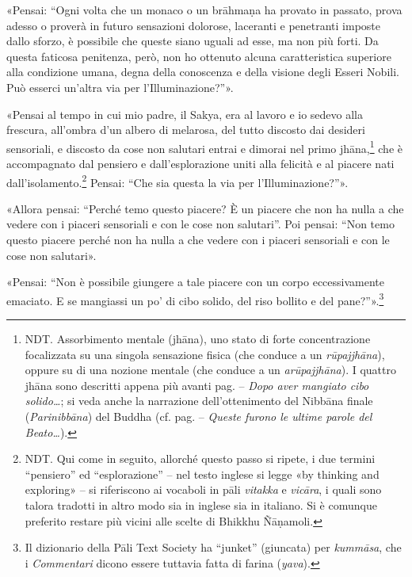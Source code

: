 
«Pensai: “Ogni volta che un monaco o un brāhmaṇa ha provato in passato, prova
adesso o proverà in futuro sensazioni dolorose, laceranti e penetranti imposte
dallo sforzo, è possibile che queste siano uguali ad esse, ma non più forti. Da
questa faticosa penitenza, però, non ho ottenuto alcuna caratteristica superiore
alla condizione umana, degna della conoscenza e della visione degli Esseri
Nobili. Può esserci un’altra via per l’Illuminazione?”».

«Pensai al tempo in cui mio padre, il Sakya, era al lavoro e io sedevo alla
frescura, all’ombra d’un albero di melarosa, del tutto discosto dai desideri
sensoriali, e discosto da cose non salutari entrai e dimorai nel primo
jhāna,\footnote{NDT. Assorbimento mentale (jhāna), uno stato di forte
  concentrazione focalizzata su una singola sensazione fisica (che conduce a un
  \emph{rūpajjhāna}), oppure su di una nozione mentale (che conduce a un
  \emph{arūpajjhāna}). I quattro jhāna sono descritti appena più avanti pag.
  \pageref{pag27} -- \emph{Dopo aver mangiato cibo solido\ldots}; si veda anche
  la narrazione dell’ottenimento del Nibbāna finale (\emph{Parinibbāna}) del
  Buddha (cf. pag. \pageref{pag364} -- \emph{Queste furono le ultime parole del
    Beato\ldots}).} che è accompagnato dal pensiero e dall’esplorazione uniti
alla felicità e al piacere nati dall’isolamento.\footnote{NDT. Qui come in
  seguito, allorché questo passo si ripete, i due termini “pensiero” ed
  “esplorazione” – nel testo inglese si legge «by thinking and exploring» – si
  riferiscono ai vocaboli in pāli \emph{vitakka} e \emph{vicāra}, i quali sono
  talora tradotti in altro modo sia in inglese sia in italiano. Si è comunque
  preferito restare più vicini alle scelte di Bhikkhu Ñāṇamoli.} Pensai: “Che
sia questa la via per l’Illuminazione?”».

«Allora pensai: “Perché temo questo piacere? È un piacere che non ha nulla a che
vedere con i piaceri sensoriali e con le cose non salutari”. Poi pensai: “Non
temo questo piacere perché non ha nulla a che vedere con i piaceri sensoriali e
con le cose non salutari».

«Pensai: “Non è possibile giungere a tale piacere con un corpo eccessivamente
emaciato. E se mangiassi un po’ di cibo solido, del riso bollito e del
pane?”».\footnote{Il dizionario della Pāli Text Society ha “junket” (giuncata)
  per \emph{kummāsa}, che i \emph{Commentari} dicono essere tuttavia fatta di
  farina (\emph{yava}).}


